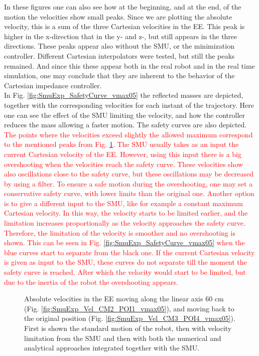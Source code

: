 In these figures one can also see how at the beginning, and at the end, of the motion the velocities show small peaks. Since we are plotting the absolute velocity, this is a sum of the three Cartesian velocities in the EE. This peak is higher in the x-direction that in the y- and z-, but still appears in the three directions. These peaks appear also without the SMU, or the minimization controller. Different Cartesian interpolators were tested, but still the peaks remained. And since this these appear both in the real robot and in the real time simulation, one may conclude that they are inherent to the behavior of the Cartesian impedance controller.  \\ 
In Fig. \ref{fig:SmuExp_SafetyCurve_vmax05} the reflected masses are depicted, together with the corresponding velocities for each instant of the trajectory. Here one can see the effect of the SMU limiting the velocity, and how the controller reduces the mass allowing a faster motion. The safety curves are also depicted.
%
\textcolor{red}{The points where the velocities exceed slightly the allowed maximum correspond to the mentioned peaks from Fig. \ref{fig:SmuExp_Vel_vmax05}. The SMU usually takes as an input the current Cartesian velocity of the EE. However, using this input there is a big overshooting when the velocities reach the safety curve. These velocities show also oscillations close to the safety curve, but these oscillations may be decreased by using a filter. To ensure a safe motion  during the overshooting, one may set a conservative safety curve, with lower limits than the original one. Another option is to give a different input to the SMU, like for example a constant maximum Cartesian velocity. In this way, the velocity starts to be limited earlier, and the limitation increases proportionally as the velocity approaches the safety curve. Therefore, the limitation of the velocity is smoother and no overshooting is shown. This can be seen in Fig. \ref{fig:SmuExp_SafetyCurve_vmax05}  when the blue curves start to separate from the black one. If the current Cartesian velocity is given as input to the SMU, these curves do not separate till the moment the safety curve is reached. After which the velocity would start to be limited, but due to the inertia of the robot the overshooting  appears. }

\begin{figure}[htp!]
	\centering	
	 	 	
		\caption{Absolute velocities in the EE moving along the linear axis 60 cm (Fig. \ref{fig:SmuExp_Vel_CM2_POI1_vmax05}), and moving back to the original position (Fig. \ref{fig:SmuExp_Vel_CM3_POI4_vmax05}). First is shown the standard motion of the robot, then with velocity limitation from the SMU and then with both the numerical and analytical approaches integrated together with the SMU.}
	\label{fig:SmuExp_Vel_vmax05}
\end{figure}




